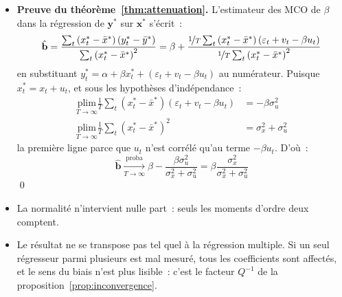 \documentclass[10pt,a4paper]{article}
\newcommand{\plim}{\xrightarrow[T\rightarrow\infty]{\text{proba}}}
\theoremstyle{definition}
\renewcommand{\newline}{\unskip\par\vspace{1.5pt}}
\begin{document}
\begin{notes}

  \begin{itemize}

  \item \textbf{Preuve du théorème~\ref{thm:attenuation}.} L'estimateur des MCO
    de $\beta$ dans la régression de $\mathbf y^*$ sur $\mathbf x^*$ s'écrit~:
    \[
      \hat{\mathbf b} = \frac{\sum_t\left(x_t^* - \bar{x}^*\right)\left(y_t^* - \bar{y}^*\right)}{\sum_t\left(x_t^* - \bar{x}^*\right)^2}
      = \beta + \frac{\nicefrac{1}{T}\sum_t\left(x_t^* - \bar{x}^*\right)\left(\varepsilon_t + v_t - \beta u_t\right)}{\nicefrac{1}{T}\sum_t\left(x_t^* - \bar{x}^*\right)^2}
    \]
    en substituant $y_t^* = \alpha + \beta x_t^* + (\varepsilon_t+v_t-\beta u_t)$
    au numérateur. Puisque $x_t^* = x_t + u_t$, et sous les hypothèses
    d'indépendance~:
    \[
      \begin{split}
        \underset{T\rightarrow\infty}{\text{plim}} \frac{1}{T}\sum_t\left(x_t^* - \bar{x}^*\right)\left(\varepsilon_t + v_t - \beta u_t\right) &= -\beta\sigma_u^2 \\
        \underset{T\rightarrow\infty}{\text{plim}} \frac{1}{T}\sum_t\left(x_t^* - \bar{x}^*\right)^2 &= \sigma_x^2 + \sigma_u^2
      \end{split}
    \]
    la première ligne parce que $u_t$ n'est corrélé qu'au terme $-\beta u_t$.
    D'où~:
    \[
      \hat{\mathbf b} \plim \beta - \frac{\beta\sigma_u^2}{\sigma_x^2 + \sigma_u^2} = \beta \frac{\sigma_x^2}{\sigma_x^2 + \sigma_u^2}
    \]
    \qed\newline

  \item La normalité n'intervient nulle part~: seuls les moments d'ordre deux
    comptent.\newline

  \item[\dbend] Le résultat ne se transpose pas tel quel à la régression
    multiple. Si un seul régresseur parmi plusieurs est mal mesuré, tous les
    coefficients sont affectés, et le sens du biais n'est plus lisible~: c'est
    le facteur $Q^{-1}$ de la proposition~\ref{prop:inconvergence}.

  \end{itemize}

\end{notes}
\end{document}
